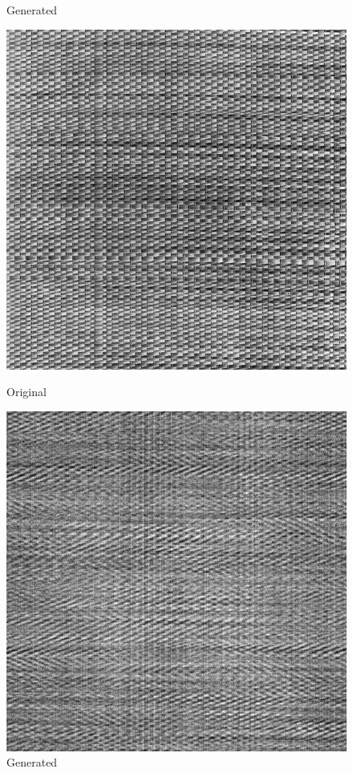 \documentclass{article}
\begin{document}
\begin{figure}[!htb]
\begin{center}
      \caption{Generated}
    \end{center}
    \endminipage
    \end{figure}
    
    \begin{figure}[!htb]
    \begin{center}
      \includegraphics[scale=.3]{5/report/random/4.png}
      \caption{Original}
    \end{center}
    \endminipage \hfill
    \begin{center}
      \includegraphics[scale=.3]{5/report/random/4_c.png}
      \caption{Generated}
    \end{center}
    \endminipage
    \end{figure}
\end{document}
